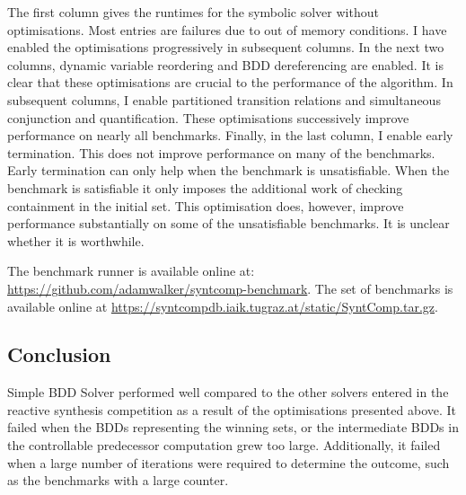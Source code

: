 The first column gives the runtimes for the symbolic solver without optimisations. Most entries are failures due to out of memory conditions. I have enabled the optimisations progressively in subsequent columns. In the next two columns, dynamic variable reordering and BDD dereferencing are enabled. It is clear that these optimisations are crucial to the performance of the algorithm. In subsequent columns, I enable partitioned transition relations and simultaneous conjunction and quantification. These optimisations successively improve performance on nearly all benchmarks. Finally, in the last column, I enable early termination. This does not improve performance on many of the benchmarks. Early termination can only help when the benchmark is unsatisfiable. When the benchmark is satisfiable it only imposes the additional work of checking containment in the initial set. This optimisation does, however, improve performance substantially on some of the unsatisfiable benchmarks. It is unclear whether it is worthwhile.

The benchmark runner is available online at: \url{https://github.com/adamwalker/syntcomp-benchmark}. The set of benchmarks is available online at \url{https://syntcompdb.iaik.tugraz.at/static/SyntComp.tar.gz}.

\subsection{Conclusion}
Simple BDD Solver performed well compared to the other solvers entered in the reactive synthesis competition as a result of the optimisations presented above. It failed when the BDDs representing the winning sets, or the intermediate BDDs in the controllable predecessor computation grew too large. Additionally, it failed when a large number of iterations were required to determine the outcome, such as the benchmarks with a large counter. 

